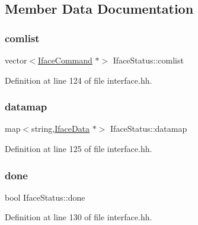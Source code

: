 \subsection{Member Data Documentation}
\mbox{\label{class_iface_status_a6bbe06c5f2004969442bd49b5cad7b14}} 
\subsubsection{\texorpdfstring{comlist}{comlist}}
{\footnotesize\ttfamily vector$<$\mbox{\hyperlink{class_iface_command}{Iface\+Command}} $\ast$$>$ Iface\+Status\+::comlist\hspace{0.3cm}{\ttfamily [protected]}}



Definition at line 124 of file interface.\+hh.

\mbox{\label{class_iface_status_ac85d5fe1254b348a3f77a9d5ec6603b8}} 
\subsubsection{\texorpdfstring{datamap}{datamap}}
{\footnotesize\ttfamily map$<$string,\mbox{\hyperlink{class_iface_data}{Iface\+Data}} $\ast$$>$ Iface\+Status\+::datamap\hspace{0.3cm}{\ttfamily [protected]}}



Definition at line 125 of file interface.\+hh.

\mbox{\label{class_iface_status_aa8a31d6b1164019ee725b33e52769254}} 
\subsubsection{\texorpdfstring{done}{done}}
{\footnotesize\ttfamily bool Iface\+Status\+::done}



Definition at line 130 of file interface.\+hh.

\mbox{\label{class_iface_status_ac17129c5b310027bbdf5cea44c0de3d6}} 
